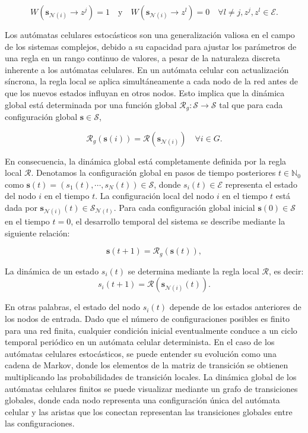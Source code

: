 \begin{equation}\label{eq:49}
	W\left(\mathbf{s}_{\mathcal{N}(i)}\rightarrow z^j\right)=1 \quad \text{y} \quad W\left(\mathbf{s}_{\mathcal{N}(i)}\rightarrow z^l\right)=0 \quad \forall l\neq j,z^j,z^l\in\mathcal{E}.
\end{equation}


Los autómatas celulares estocásticos son una generalización valiosa en el campo de los sistemas complejos, debido a su capacidad para ajustar los parámetros de una regla en un rango continuo de valores, a pesar de la naturaleza discreta inherente a los autómatas celulares.   En un autómata celular con actualización síncrona, la regla local se aplica simultáneamente a cada nodo de la red antes de que los nuevos estados influyan en otros nodos. Esto implica que la dinámica global está determinada por una función global  $\mathcal{R}_g:\mathcal{S}\rightarrow\mathcal{S}$ tal que para cada configuración global $\mathbf{s} \in \mathcal{S}$,

\begin{equation}\label{eq:50}
	\mathcal{R}_g(\mathbf{s}(i))=\mathcal{R}\left(\mathbf{s}_{\mathcal{N}(i)}\right) \quad \forall i\in G.
\end{equation}

En consecuencia, la dinámica global está completamente definida por la regla local $\mathcal{R}$.   Denotamos la configuración global en pasos de tiempo posteriores $t \in \mathbb{N}_0$ como  $\mathbf{s}(t)= (s_1(t),\cdots, s_N( t)) \in \mathcal{S}$, donde $s_i(t) \in \mathcal{E}$ representa el estado del nodo  $i$ en el tiempo $t$.  La configuración local del nodo $i$ en el tiempo $t$  está dada por $\mathbf{s}_{\mathcal{N}(i)} (t) \in  \mathcal{S}_{\mathcal{N} (t)}$.   Para cada configuración global inicial 
 $\mathbf{s} (0) \in \mathcal{S}$ en el tiempo $t=0$,  el desarrollo temporal del sistema se describe mediante la siguiente relación:


\begin{equation}\label{eq:51}
\mathbf{s}(t+1)=\mathcal{R}_g(\mathbf{s}(t)),
\end{equation}

La dinámica de un estado $s_i(t)$ se determina mediante la regla local $\mathcal{R}$,  es decir:
\begin{equation}\label{eq:52}
s_i(t+1)=\mathcal{R}\left(\mathbf{s}_{\mathcal{N}(i)}(t)\right).
\end{equation}

En otras palabras, el estado del nodo $s_i( t )$ depende de los estados anteriores de los nodos de entrada.  Dado que el número de configuraciones posibles es finito para una red finita, cualquier condición inicial eventualmente conduce a un ciclo temporal periódico en un autómata celular determinista. En el caso de los autómatas celulares estocásticos, se puede entender su evolución como una cadena de Markov, donde los elementos de la matriz de transición se obtienen multiplicando las probabilidades de transición locales. La dinámica global de los autómatas celulares finitos se puede visualizar mediante un grafo de transiciones globales, donde cada nodo representa una configuración única del autómata celular y las aristas que los conectan representan las transiciones globales entre las configuraciones.


